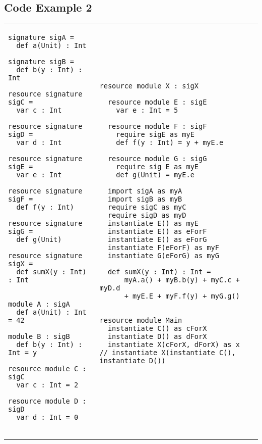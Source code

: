 \documentclass{llncs}
\begin{document}
\newpage

\subsection{Code Example 2}

\begin{tabular}{p{}p{}}
\begin{minipage}[t]{\textwidth}
\begin{lstlisting}
signature sigA = 
  def a(Unit) : Int

signature sigB =
  def b(y : Int) : Int

resource signature sigC =
  var c : Int

resource signature sigD =
  var d : Int

resource signature sigE =
  var e : Int
  
resource signature sigF =
  def f(y : Int)
  
resource signature sigG =
  def g(Unit)

resource signature sigX =
  def sumX(y : Int) : Int


module A : sigA
  def a(Unit) : Int = 42

module B : sigB
  def b(y : Int) : Int = y

resource module C : sigC
  var c : Int = 2

resource module D : sigD
  var d : Int = 0
  
\end{lstlisting}
\end{minipage}
&
\hspace{-10ex}
\begin{minipage}[t]{\textwidth}
\begin{lstlisting}
resource module X : sigX

  resource module E : sigE
    var e : Int = 5

  resource module F : sigF
    require sigE as myE
    def f(y : Int) = y + myE.e

  resource module G : sigG
    require sig E as myE
    def g(Unit) = myE.e

  import sigA as myA
  import sigB as myB
  require sigC as myC
  require sigD as myD
  instantiate E() as myE
  instantiate E() as eForF
  instantiate E() as eForG
  instantiate F(eForF) as myF
  instantiate G(eForG) as myG

  def sumX(y : Int) : Int = 
      myA.a() + myB.b(y) + myC.c + myD.d
      + myE.E + myF.f(y) + myG.g()


resource module Main
  instantiate C() as cForX
  instantiate D() as dForX
  instantiate X(cForX, dForX) as x
// instantiate X(instantiate C(), instantiate D())



\end{lstlisting}
\end{minipage}
\end{tabular}
\end{document}
